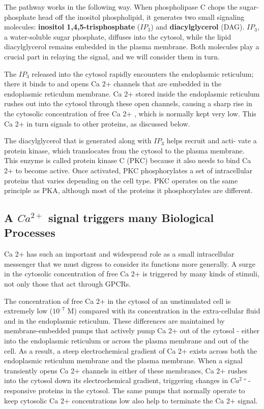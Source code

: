 The pathway works in the following way. When phospholipase C chops
the sugar-phosphate head off the inositol phospholipid, it generates two
small signaling molecules: \textbf{inositol 1,4,5-trisphosphate} ($IP_3$) and \textbf{diacylglycerol} 
(DAG). $IP_3$, a water-soluble sugar phosphate, diffuses into the
cytosol, while the lipid diacylglycerol remains embedded in the plasma
membrane. Both molecules play a crucial part in relaying the signal, and
we will consider them in turn.

The $IP_3$ released into the cytosol rapidly encounters the endoplasmic
reticulum; there it binds to and opens Ca 2+ channels that are embedded in
the endoplasmic reticulum membrane. Ca 2+ stored inside the endoplasmic 
reticulum rushes out into the cytosol through these open channels, 
causing a sharp rise in the cytosolic concentration of free
Ca 2+ , which is normally kept very low. This Ca 2+ in turn signals to other
proteins, as discussed below.

The diacylglycerol that is generated along with $IP_3$ helps recruit and acti-
vate a protein kinase, which translocates from the cytosol to the plasma
membrane. This enzyme is called protein kinase C (PKC) because it also
needs to bind Ca 2+ to become active. Once activated,
PKC phosphorylates a set of intracellular proteins that varies depending
on the cell type. PKC operates on the same principle as PKA, although
most of the proteins it phosphorylates are different.

\subsection{A $Ca^{2+}$ signal triggers many Biological Processes}

Ca 2+ has such an important and widespread role as a small intracellular
messenger that we must digress to consider its functions more generally.
A surge in the cytosolic concentration of free Ca 2+ is triggered by many
kinds of stimuli, not only those that act through GPCRs.

The concentration of free Ca 2+ in the cytosol of an unstimulated cell is
extremely low ($10^{–7}$ M) compared with its concentration in the extra-cellular 
fluid and in the endoplasmic reticulum. These differences are
maintained by membrane-embedded pumps that actively pump Ca 2+
out of the cytosol - either into the endoplasmic reticulum or across the
plasma membrane and out of the cell. As a result, a steep electrochemical
gradient of Ca 2+ exists across both the endoplasmic reticulum membrane
and the plasma membrane. When a signal transiently opens Ca 2+ channels 
in either of these membranes, Ca 2+ rushes
into the cytosol down its electrochemical gradient, triggering changes in
$Ca^{2+}$-responsive proteins in the cytosol. The same pumps that normally
operate to keep cytosolic Ca 2+ concentrations low also help to terminate
the Ca 2+ signal.

